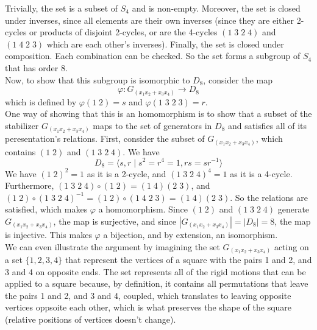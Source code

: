 \documentclass{article}
\begin{document}
\begin{enumerate}[label=\textbf{\alph*.}]
            Trivially, the set is a subset of $S_4$ and is non-empty.
            Moreover, the set is closed under inverses,
            since all elements are their own inverses (since they
            are either 2-cycles or products of disjoint 2-cycles,
            or are the 4-cycles $(1\;3\;2\;4)$ and $(1\;4\;2\;3)$
            which are each other's inverses).
            Finally, the set is closed under composition.
            Each combination can be checked.
            So the set forms a subgroup of $S_4$ that has order 8. \\
            Now, to show that this subgroup is isomorphic to $D_8$,
            consider the map
            \[ \varphi: G_{(x_1x_2 + x_3x_4)} \to D_8 \]
            which is defined by $\varphi(1\;2) = s$
            and $\varphi(1\;3\;2\;3) = r$. \\
            One way of showing that this is an homomorphism is
            to show that a subset of the stabilizer $G_{(x_1x_2 + x_3x_4)}$
            maps to the set of generators in $D_8$ and satisfies
            all of its peresentation's relations.
            First, consider the subset of $G_{(x_1x_2 + x_3x_4)}$,
            which contains $(1\;2)$ and $(1\;3\;2\;4)$.
            We have
            \[ D_8 = \langle s, r \mid s^2 = r^4 = 1, rs = sr^{-1} \rangle \]
            We have $(1\;2)^2 = 1$ as it is a 2-cycle,
            and $(1\;3\;2\;4)^4 = 1$ as it is a 4-cycle. \\
            Furthermore, $(1\;3\;2\;4) \circ (1\;2) = (1\;4)(2\;3)$,
            and $(1\;2) \circ (1\;3\;2\;4)^{-1}
            = (1\;2) \circ (1\;4\;2\;3)
            = (1\;4)(2\;3)$.
            So the relations are satisfied,
            which makes $\varphi$ a homomorphism.
            Since $(1\;2)$ and $(1\;3\;2\;4)$ generate $G_{(x_1x_2 + x_3x_4)}$,
            the map is surjective,
            and since $|G_{(x_1x_2 + x_3x_4)}| = |D_8| = 8$,
            the map is injective.
            This makes $\varphi$ a bijection,
            and by extension, an isomorphism. \\
            We can even illustrate the argument by imagining
            the set $G_{(x_1x_2 + x_3x_4)}$ acting on a set $\{1, 2, 3, 4\}$
            that represent the vertices of a square
            with the pairs 1 and 2, and 3 and 4 on opposite ends.
            The set represents all of the rigid motions that can be applied
            to a square because, by definition,
            it contains all permutations that leave the pairs 
            1 and 2, and 3 and 4, coupled,
            which translates to leaving opposite vertices oppsoite each other,
            which is what preserves the shape of the square
            (relative positions of vertices doesn't change).


\end{enumerate}
\end{document}
